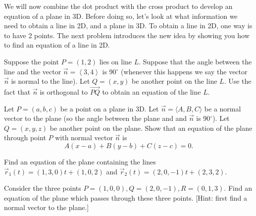 \vskip0.2in

We will now combine the dot product with the cross product to develop an equation of a plane in 3D. 
Before doing so, let's look at what information we need to obtain a line in 2D, and a plane in 3D.  
To obtain a line in 2D, one way is to have 2 points. 
The next problem introduces the new idea by showing you how to find an equation of a line in 2D. 

\begin{problem}\label{prob:plane equation normal point}
Suppose the point $P=(1,2)$ lies on line $L$. Suppose that the angle between the line and the vector $\vec n=\left<3,4\right>$ is 90$^\circ$ (whenever this happens we say the vector $\vec n$ is normal to the line). Let $Q=(x,y)$ be another point on the line $L$. Use the fact that $\vec n$ is orthogonal to $\vec {PQ}$ to obtain an equation of the line $L$. 
\end{problem}


\begin{problem}\label{plane equation three points}
%
Let $P=(a,b,c)$ be a point on a plane in 3D. Let $\vec n=\langle A,B,C \rangle $ be a normal vector to the plane (so the angle between the plane and and $\vec n$ is 90$^\circ$).  Let $Q=(x,y,z)$ be another point on the plane.  Show that an equation of the plane through point $P$ with normal vector $\vec n$ is $$A(x-a)+B(y-b)+C(z-c)=0.$$
\end{problem}



\begin{problem}\label{plane equation 2 lines}
%
Find an equation of the plane containing the lines $\vec r_1(t)=(1,3,0)t+(1,0,2)$ and $\vec r_2(t)=(2,0,-1)t+(2,3,2)$.
\end{problem}

\begin{problem}  
%
Consider the three points $P=(1,0,0), Q=(2,0,-1), R=(0,1,3)$. Find an equation of the plane which passes through these three points.  [Hint: first find a normal vector to the plane.]
\end{problem}

